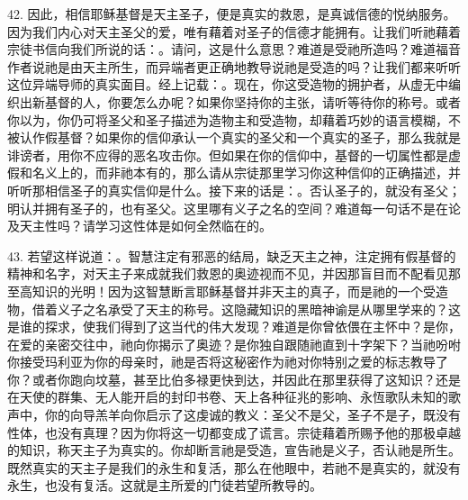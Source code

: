 42. 因此，相信耶稣基督是天主圣子，便是真实的救恩，是真诚信德的悦纳服务。因为我们内心对天主圣父的爱，唯有藉着对圣子的信德才能拥有。让我们听祂藉着宗徒书信向我们所说的话：。请问，这是什么意思？难道是受祂所造吗？难道福音作者说祂是由天主所生，而异端者更正确地教导说祂是受造的吗？让我们都来听听这位异端导师的真实面目。经上记载：。现在，你这受造物的拥护者，从虚无中编织出新基督的人，你要怎么办呢？如果你坚持你的主张，请听等待你的称号。或者你以为，你仍可将圣父和圣子描述为造物主和受造物，却藉着巧妙的语言模糊，不被认作假基督？如果你的信仰承认一个真实的圣父和一个真实的圣子，那么我就是诽谤者，用你不应得的恶名攻击你。但如果在你的信仰中，基督的一切属性都是虚假和名义上的，而非祂本有的，那么请从宗徒那里学习你这种信仰的正确描述，并听听那相信圣子的真实信仰是什么。接下来的话是：。否认圣子的，就没有圣父；明认并拥有圣子的，也有圣父。这里哪有义子之名的空间？难道每一句话不是在论及天主性吗？请学习这性体是如何全然临在的。\par

43. 若望这样说道：。智慧注定有邪恶的结局，缺乏天主之神，注定拥有假基督的精神和名字，对天主子来成就我们救恩的奥迹视而不见，并因那盲目而不配看见那至高知识的光明！因为这智慧断言耶稣基督并非天主的真子，而是祂的一个受造物，借着义子之名承受了天主的称号。这隐藏知识的黑暗神谕是从哪里学来的？这是谁的探求，使我们得到了这当代的伟大发现？难道是你曾依偎在主怀中？是你，在爱的亲密交往中，祂向你揭示了奥迹？是你独自跟随祂直到十字架下？当祂吩咐你接受玛利亚为你的母亲时，祂是否将这秘密作为祂对你特别之爱的标志教导了你？或者你跑向坟墓，甚至比伯多禄更快到达，并因此在那里获得了这知识？还是在天使的群集、无人能开启的封印书卷、天上各种征兆的影响、永恆歌队未知的歌声中，你的向导羔羊向你启示了这虔诚的教义：圣父不是父，圣子不是子，既没有性体，也没有真理？因为你将这一切都变成了谎言。宗徒藉着所赐予他的那极卓越的知识，称天主子为真实的。你却断言祂是受造，宣告祂是义子，否认祂是所生。既然真实的天主子是我们的永生和复活，那么在他眼中，若祂不是真实的，就没有永生，也没有复活。这就是主所爱的门徒若望所教导的。\par

